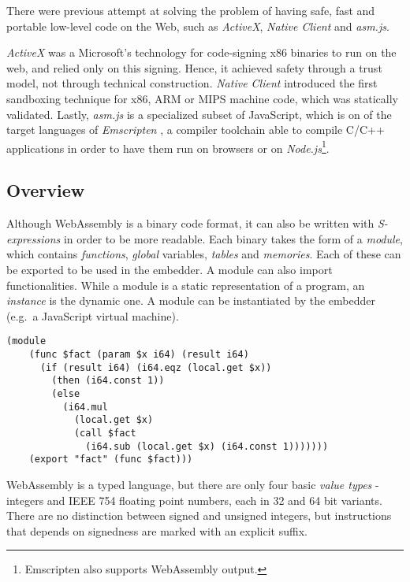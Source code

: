 There were previous attempt at solving the problem of having safe, fast and portable low-level code on the Web,
such as \textit{ActiveX}, \textit{Native Client} and \textit{asm.js}.

\textit{ActiveX} \cite{activex} was a Microsoft's technology for code-signing x86 binaries to run on the web, and relied only
on this signing. Hence, it achieved safety through a trust model, not through technical construction.
\textit{Native Client} \cite{native-client} introduced the first sandboxing technique for x86, ARM or MIPS machine code,
which was statically validated. Lastly, \textit{asm.js} \cite{asmjs} is a specialized subset of JavaScript, which is on of the target
languages of \textit{Emscripten} \cite{emscripten}, a compiler toolchain able to compile C/C++ applications in order to have them
run on browsers or on \textit{Node.js}\footnote{ Emscripten also supports WebAssembly output.}.

\subsection{Overview}

Although WebAssembly is a binary code format, it can also be written with \textit{S-expressions}
in order to be more readable.
Each binary takes the form of a \textit{module}, which contains \textit{functions}, \textit{global} variables,
\textit{tables} and \textit{memories}. Each of these can be exported to be used in the embedder.
A module can also import functionalities.
While a module is a static representation of a program, an \textit{instance} is the dynamic one.
A module can be instantiated by the embedder (e.g.\ a JavaScript virtual machine).

\begin{lstlisting}[language=wasm, caption={Factorial written in WebAssembly S-expressions}, label=lst:wasm-fact]
  (module
    (func $fact (param $x i64) (result i64)
      (if (result i64) (i64.eqz (local.get $x))
        (then (i64.const 1))
        (else
          (i64.mul
            (local.get $x)
            (call $fact
              (i64.sub (local.get $x) (i64.const 1)))))))
    (export "fact" (func $fact)))
\end{lstlisting}

WebAssembly is a typed language, but there are only four basic \textit{value types} - integers and IEEE 754 floating
point numbers, each in 32 and 64 bit variants. There are no distinction between signed and unsigned integers,
but instructions that depends on signedness are marked with an explicit suffix.

